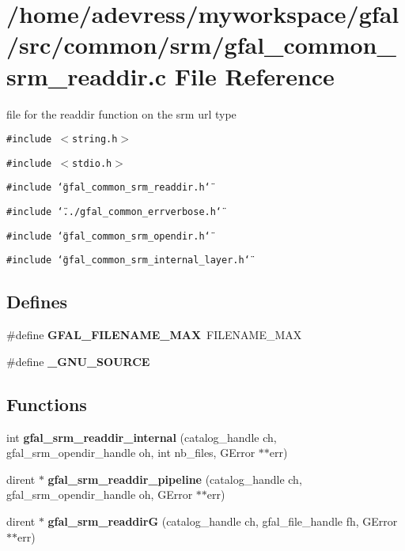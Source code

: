 \section{/home/adevress/myworkspace/gfal/src/common/srm/gfal\_\-common\_\-srm\_\-readdir.c File Reference}
\label{gfal__common__srm__readdir_8c}
file for the readdir function on the srm url type 

{\tt \#include $<$string.h$>$}\par
{\tt \#include $<$stdio.h$>$}\par
{\tt \#include \char`\"{}gfal\_\-common\_\-srm\_\-readdir.h\char`\"{}}\par
{\tt \#include \char`\"{}../gfal\_\-common\_\-errverbose.h\char`\"{}}\par
{\tt \#include \char`\"{}gfal\_\-common\_\-srm\_\-opendir.h\char`\"{}}\par
{\tt \#include \char`\"{}gfal\_\-common\_\-srm\_\-internal\_\-layer.h\char`\"{}}\par
\subsection*{Defines}
\begin{CompactItemize}
\item 
\#define \textbf{GFAL\_\-FILENAME\_\-MAX}~FILENAME\_\-MAX\label{gfal__common__srm__readdir_8c_595a5b00305895e25ce0e00b177fd8a8}

\item 
\#define \textbf{\_\-GNU\_\-SOURCE}\label{gfal__common__srm__readdir_8c_53abf256730d533302d1910e5fb61efe}

\end{CompactItemize}
\subsection*{Functions}
\begin{CompactItemize}
\item 
int \textbf{gfal\_\-srm\_\-readdir\_\-internal} (catalog\_\-handle ch, gfal\_\-srm\_\-opendir\_\-handle oh, int nb\_\-files, GError $\ast$$\ast$err)\label{gfal__common__srm__readdir_8c_6cd12051a919c3d0e07a6c5e2ac91cb9}

\item 
dirent $\ast$ \textbf{gfal\_\-srm\_\-readdir\_\-pipeline} (catalog\_\-handle ch, gfal\_\-srm\_\-opendir\_\-handle oh, GError $\ast$$\ast$err)\label{gfal__common__srm__readdir_8c_22a02c9e8668edcc2b552ffbf6e9e433}

\item 
dirent $\ast$ \textbf{gfal\_\-srm\_\-readdir\-G} (catalog\_\-handle ch, gfal\_\-file\_\-handle fh, GError $\ast$$\ast$err)\label{gfal__common__srm__readdir_8c_fbf0023f141e4c099c13cbc506bdf2dd}

\end{CompactItemize}


